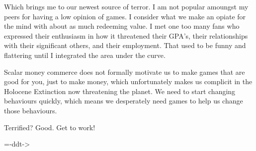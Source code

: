 \par
Which brings me to our newest source of terror.  I am not popular amoungst my peers for having a low opinion of games.  I consider what we make an opiate for the mind with about as much redeeming value.  I met one too many \doom{} fans who expressed their enthusiasm in how it threatened their GPA's, their relationships with their significant others, and their employment.  That used to be funny and flattering until I integrated the area under the curve.\\
\par
Scalar money commerce does not formally motivate us to make games that are good for you, just to make money, which unfortunately makes us complicit in the Holocene Extinction now threatening the planet.  We need to start changing behaviours quickly, which means we desperately need games to help us change those behaviours.\\
\par
Terrified?  Good.  Get to work!\\
\par
        =-ddt->\\
\thispagestyle{plain} %
